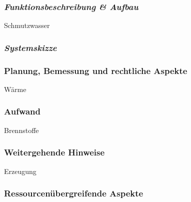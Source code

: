 \documentclass[
]{article}
\begin{document}
\hypertarget{funktionsbeschreibung-aufbau}{%
\subsubsection{\texorpdfstring{\emph{Funktionsbeschreibung \&
Aufbau}}{Funktionsbeschreibung \& Aufbau}}\label{funktionsbeschreibung-aufbau}}

Schmutzwasser

\hypertarget{systemskizze}{%
\subsubsection{\texorpdfstring{\emph{Systemskizze}}{Systemskizze}}\label{systemskizze}}

\hypertarget{planung-bemessung-und-rechtliche-aspekte}{%
\subsubsection{Planung, Bemessung und rechtliche
Aspekte}\label{planung-bemessung-und-rechtliche-aspekte}}

Wärme

\hypertarget{aufwand}{%
\subsubsection{Aufwand}\label{aufwand}}

Brennstoffe

\hypertarget{weitergehende-hinweise}{%
\subsubsection{Weitergehende Hinweise}\label{weitergehende-hinweise}}

Erzeugung

\hypertarget{ressourcenuxfcbergreifende-aspekte}{%
\subsubsection{Ressourcenübergreifende
Aspekte}\label{ressourcenuxfcbergreifende-aspekte}}
\end{document}
